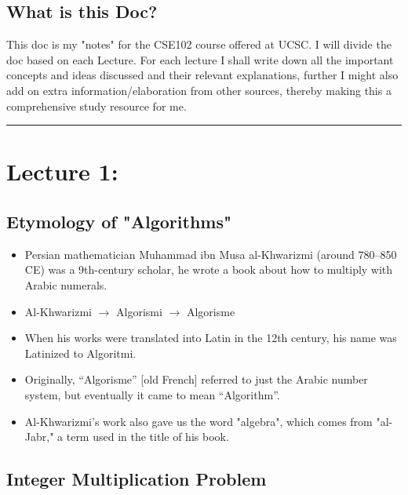\documentclass{article}
\begin{document}
\subsection*{What is this Doc?}

This doc is my "notes" for the CSE102 course offered at UCSC. I will divide the doc based on each Lecture. For each lecture I shall write down all the important concepts and ideas discussed and their relevant explanations, further I might also add on extra information/elaboration from other sources, thereby making this a comprehensive study resource for me.
\begin{center}
	\rule{450pt}{3pt} 
\end{center}
\newpage

\section*{Lecture 1:}

\subsection*{Etymology of "Algorithms"}

\begin{itemize}
    \item Persian mathematician Muhammad ibn Musa al-Khwarizmi (around 780–850 CE) was a 9th-century scholar, he wrote a book about how to multiply with Arabic numerals.
    \item Al-Khwarizmi $\rightarrow$ Algorismi $\rightarrow$ Algorisme
    \item When his works were translated into Latin in the 12th century, his name was Latinized to Algoritmi.
    \item Originally, “Algorisme” [old French] referred to just the Arabic number system, but eventually it came to mean “Algorithm”.
    \item Al-Khwarizmi's work also gave us the word "algebra", which comes from "al-Jabr," a term used in the title of his book.
\end{itemize}

\subsection*{Integer Multiplication Problem}
\end{document}
